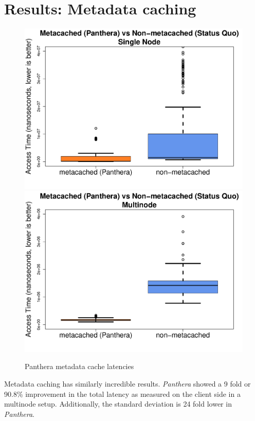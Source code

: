 \documentclass[12pt]{article}
\begin{document}
\section{Results: Metadata caching}
\begin{figure}[!h]
	\caption{Panthera metadata cache latencies}
	\centering
		\includegraphics[scale=0.3]{assets/box-plot-metadata.pdf}
		\includegraphics[scale=0.3]{assets/box-plot-metadata-multinode.pdf}
\end{figure}

Metadata caching has similarly incredible results. \textit{Panthera} showed a 9 fold or 90.8\% improvement in the total latency as measured on the client side in a multinode setup. Additionally, the standard deviation is 24 fold lower in \textit{Panthera}.
\end{document}
